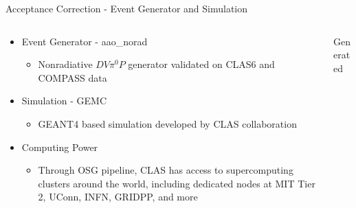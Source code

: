 \documentclass[aspectratio=169]{beamer}
\begin{document}

\begin{frame}{Acceptance Correction - Event Generator and Simulation}
     \begin{columns}[c]
               \begin{column}{0.5\textwidth}

                    \begin{itemize}
                        \item Event Generator - aao\_norad
                            \begin{itemize}
                                \item Nonradiative $DV\pi^0P$ generator validated on CLAS6 and COMPASS data
                            \end{itemize}
                        \item Simulation - GEMC
                            \begin{itemize}
                                \item GEANT4 based simulation developed by CLAS collaboration
                            \end{itemize}
                        \item Computing Power
                            \begin{itemize}
                                \item Through OSG pipeline, CLAS has access to supercomputing clusters around the world, including dedicated nodes at MIT Tier 2, UConn, INFN, GRIDPP, and more
                            \end{itemize}
                    \end{itemize}
                    \end{column}
                    
                    
    \begin{column}{0.5\textwidth}
                
                \centering Generated \\
        \begin{columns}
                    
                             

\end{columns}
\end{column}
\end{columns}
\end{frame}
\end{document}
